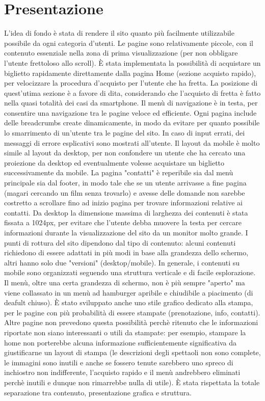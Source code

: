 \documentclass[a4paper, 12pt]{article}
\begin{document}
\section{Presentazione}
L'idea di fondo è stata di rendere il sito quanto più facilmente utilizzabile possibile da ogni categoria d'utenti.
Le pagine sono relativamente piccole, con il contenuto essenziale nella zona di prima visualizzazione (per non obbligare l'utente frettoloso allo scroll).
È stata implementata la possibilità di acquistare un biglietto rapidamente direttamente dalla pagina Home (sezione acquisto rapido), per velocizzare la procedura d'acquisto per l'utente che ha fretta.
La posizione di quest'utima sezione è a favore di dita, considerando che l'acquisto di fretta è fatto nella quasi totalità dei casi da smartphone.
Il menù di navigazione è in testa, per consentire una navigazione tra le pagine veloce ed efficiente.
Ogni pagina include delle breadcrumbs create dinamicamente, in modo da evitare per quanto possibile lo smarrimento di un'utente tra le pagine del sito.
In caso di input errati, dei messaggi di errore esplicativi sono mostrati all'utente.
Il layout da mobile è molto simile al layout da desktop, per non confondere un utente che ha cercato una proiezione da desktop ed eventualmente volesse acquistare un biglietto successivamente da mobile.
La pagina "contatti" è reperibile sia dal menù principale sia dal footer, in modo tale che se un utente arrivasse a fine pagina (magari cercando un film senza trovarlo) e avesse delle domande non sarebbe costretto a scrollare fino ad inizio pagina per trovare informazioni relative ai contatti.
Da desktop la dimensione massima di larghezza dei contenuti è stata fissata a 1024px, per evitare che l'utente debba muovere la testa per cercare informazioni durante la visualizzazione del sito da un monitor molto grande.
I punti di rottura del sito dipendono dal tipo di contenuto: alcuni contenuti richiedono di essere adattati in più modi in base alla grandezza dello schermo, altri hanno solo due "versioni" (desktop/mobile).
In generale, i contenuti su mobile sono organizzati seguendo una struttura verticale e di facile esplorazione. Il menù, oltre una certa grandezza di schermo, non è più sempre "aperto" ma viene collassato in un menù ad
hamburger apribile e chiudibile a piacimento (di deafult chiuso).
È stato sviluppato anche uno stile grafico dedicato alla stampa, per le pagine con più probabilità di essere stampate (prenotazione, info, contatti).
Altre pagine non prevedono questa possibilità perchè ritenuto che le informazioni riportate non siano interessanti o utili da stampate: per esempio, stampare la home non porterebbe alcuna informazione sufficientemente significativa da giustificarne un layout di stampa (le descrizioni degli spettaoli non sono complete, le immagini sono inutili e anche se fossero tenute sarebbero uno spreco di inchiostro
non indifferente, l'acquisto rapido e il menù andrebbero eliminati perchè inutili e dunque non rimarrebbe nulla di utile).
È stata rispettata la totale separazione tra contenuto, presentazione grafica e struttura.
\end{document}
